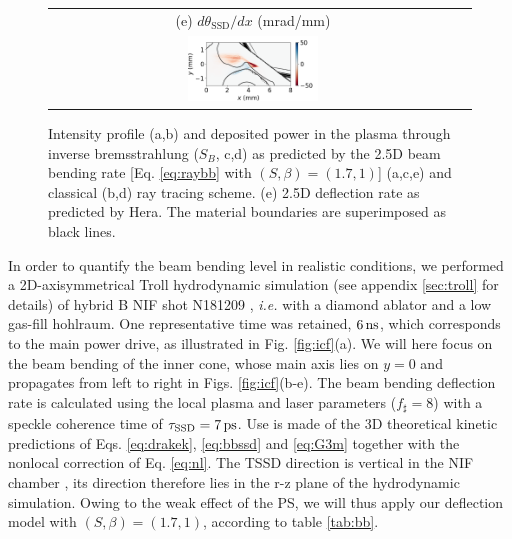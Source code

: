 \documentclass[%
 reprint,
 amsmath,amssymb,
 aps,
]{revtex4-1}
\begin{document}
\begin{figure}
\begin{tabular}{cc}
(e) $d\theta_\mathrm{SSD}/dx$ (mrad/mm)&\\
\includegraphics[width=0.33\textwidth]{Fig5e.png} 
&
\end{tabular}
\caption{ \label{fig:icfbb} 
 Intensity profile (a,b) and deposited power  in the plasma through inverse bremsstrahlung ($S_{B}$, c,d) as predicted by the   2.5D beam bending rate [Eq. \eqref{eq:raybb} with $(S,\beta)=(1.7,1)$] (a,c,e) and classical (b,d) ray tracing scheme.
 (e) 2.5D deflection rate as predicted by Hera.
  The material boundaries are superimposed as black lines.
}
\end{figure}
In order to quantify the beam bending level in realistic conditions, we performed a  2D-axisymmetrical Troll hydrodynamic simulation (see appendix \ref{sec:troll} for details) \cite[]{Lefebvre_2018}  of
hybrid B NIF shot N181209 \cite[]{POP_Kritcher_2020,POP_Zylstra_2020,POP_Hohenberger_2020}, \textit{i.e.} with 
a diamond  ablator and a low gas-fill hohlraum.
One  representative  time was retained,  $6\,\rm ns$, which corresponds  to  the  main power drive, as illustrated in Fig. \ref{fig:icf}(a).
We will here focus on the beam bending of the inner cone, whose main axis lies  on  $y=0$ and propagates  from left to right in  Figs. \ref{fig:icf}(b-e). 
The beam bending deflection rate is calculated using the local plasma and laser parameters ($f_\sharp=8$) with a speckle coherence time of $\tau_\mathrm{SSD}=7\,\rm ps$. Use is made of the 3D theoretical kinetic predictions of Eqs. \eqref{eq:drakek}, \eqref{eq:bbssd} and \eqref{eq:G3m} together with the nonlocal correction of Eq. \eqref{eq:nl}. 
The  TSSD direction is vertical in the NIF chamber \cite[]{NIF_user_guide}, its direction therefore lies in the r-z plane of the hydrodynamic simulation. Owing to the weak effect of the PS, we will thus apply our deflection model with $(S,\beta)=(1.7,1)$, according to table \ref{tab:bb}.
\end{document}
